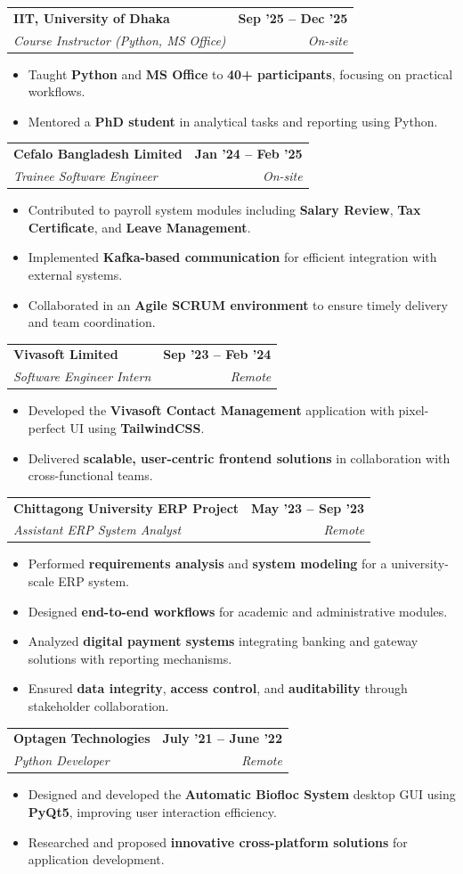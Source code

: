 \documentclass[letterpaper,11pt]{article}
\makeatletter
\newcommand{\customItem}[1]{
  \item\small{
    {#1 \vspace{-2pt}}
  }
}
\newcommand{\customSubHeading}[4]{
  \vspace{-2pt}\item
    \begin{tabular*}{1.0\textwidth}[t]{l@{\extracolsep{\fill}}r}
      \textbf{#1} & \textbf{\small #2} \\
      \textit{\small#3} & \textit{\small #4} \\
    \end{tabular*}\vspace{-7pt}
}
\newcommand{\customItemListStart}{\begin{itemize}}
\newcommand{\customItemListEnd}{\end{itemize}\vspace{-5pt}}
\makeatother
\begin{document}
    \customSubHeading
    {IIT, University of Dhaka}{Sep '25 -- Dec '25}
    {Course Instructor (Python, MS Office)}{On-site}
    \customItemListStart
        \customItem{Taught \textbf{Python} and \textbf{MS Office} to \textbf{40+ participants}, focusing on practical workflows.}
        \customItem{Mentored a \textbf{PhD student} in analytical tasks and reporting using Python.}
    \customItemListEnd

    \customSubHeading
    {Cefalo Bangladesh Limited}{Jan '24 – Feb '25}
    {Trainee Software Engineer}{On-site}
    \customItemListStart
        \customItem{Contributed to payroll system modules including \textbf{Salary Review}, \textbf{Tax Certificate}, and \textbf{Leave Management}.}
        \customItem{Implemented \textbf{Kafka-based communication} for efficient integration with external systems.}
        \customItem{Collaborated in an \textbf{Agile SCRUM environment} to ensure timely delivery and team coordination.}
    \customItemListEnd

    \customSubHeading
    {Vivasoft Limited}{Sep '23 – Feb '24}
    {Software Engineer Intern}{Remote}
    \customItemListStart
        \customItem{Developed the \textbf{Vivasoft Contact Management} application with pixel-perfect UI using \textbf{TailwindCSS}.}
        \customItem{Delivered \textbf{scalable, user-centric frontend solutions} in collaboration with cross-functional teams.}
    \customItemListEnd

    \customSubHeading
    {Chittagong University ERP Project}{May '23 -- Sep '23}
    {Assistant ERP System Analyst}{Remote}
    \customItemListStart
        \customItem{Performed \textbf{requirements analysis} and \textbf{system modeling} for a university-scale ERP system.}
        \customItem{Designed \textbf{end-to-end workflows} for academic and administrative modules.}
        \customItem{Analyzed \textbf{digital payment systems} integrating banking and gateway solutions with reporting mechanisms.}
        \customItem{Ensured \textbf{data integrity}, \textbf{access control}, and \textbf{auditability} through stakeholder collaboration.}
    \customItemListEnd

    \customSubHeading
    {Optagen Technologies}{July '21 – June '22}
    {Python Developer}{Remote}
    \customItemListStart
        \customItem{Designed and developed the \textbf{Automatic Biofloc System} desktop GUI using \textbf{PyQt5}, improving user interaction efficiency.}
        \customItem{Researched and proposed \textbf{innovative cross-platform solutions} for application development.}
    \customItemListEnd
\end{document}
